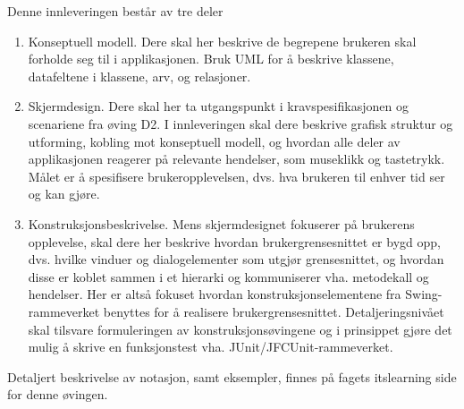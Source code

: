 Denne innleveringen består av tre deler

\begin{enumerate}

\item
Konseptuell modell. Dere skal her beskrive de begrepene brukeren skal forholde seg til i applikasjonen. Bruk UML for å beskrive klassene, datafeltene i klassene, arv, og relasjoner.

\item
Skjermdesign. Dere skal her ta utgangspunkt i kravspesifikasjonen og scenariene fra øving D2. I innleveringen skal dere beskrive grafisk struktur og utforming, kobling mot konseptuell modell, og hvordan alle deler av applikasjonen reagerer på relevante hendelser, som museklikk og tastetrykk. Målet er å spesifisere brukeropplevelsen, dvs. hva brukeren til enhver tid ser og kan gjøre.

\item
Konstruksjonsbeskrivelse. Mens skjermdesignet fokuserer på brukerens opplevelse, skal dere her beskrive hvordan brukergrensesnittet er bygd opp, dvs. hvilke vinduer og dialogelementer som utgjør grensesnittet, og hvordan disse er koblet sammen i et hierarki og kommuniserer vha. metodekall og hendelser. Her er altså fokuset hvordan konstruksjonselementene fra Swing-rammeverket benyttes for å realisere brukergrensesnittet. Detaljeringsnivået skal tilsvare formuleringen av konstruksjonsøvingene og i prinsippet gjøre det mulig å skrive en funksjonstest vha. JUnit/JFCUnit-rammeverket.

\end{enumerate}

Detaljert beskrivelse av notasjon, samt eksempler, finnes på fagets itslearning side for denne øvingen.

\newpage